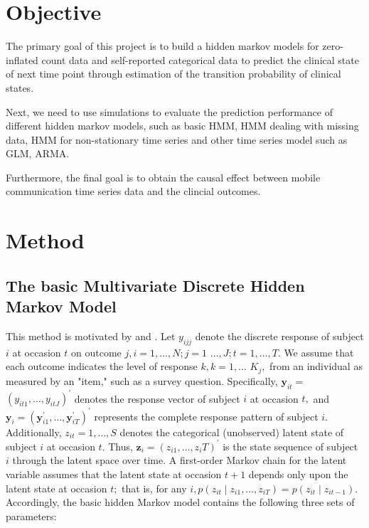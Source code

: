 \documentclass[12pt]{article}
\numberwithin{equation}{section}
\begin{document}
\section{Objective}

The primary goal of this project is to build a hidden markov models for zero-inflated count data and self-reported categorical data to predict the clinical state of next time point through estimation of the transition probability of clinical states.

Next, we need to use simulations to evaluate the prediction performance of different hidden markov models, such as basic HMM, HMM dealing with missing data, HMM for non-stationary time series and other time series model such as GLM, ARMA.

Furthermore, the final goal is to obtain the causal effect between mobile communication time series data and the clincial outcomes.

\section{Method}
\subsection{The basic Multivariate Discrete Hidden Markov Model}

This method is motivated by \citet{zhang2010multivariate} and \citet{ip2013partially}. Let $y_{i j j}$ denote the discrete response of subject $i$ at occasion $t$ on outcome $j, i=1, \ldots, N ; j=1$ $\ldots, J ; t=1, \ldots, T .$ We assume that each outcome indicates the level of response $k, k=1, \ldots$ $K_{j},$ from an individual as measured by an "item," such as a survey question. Specifically, $\mathbf{y}_{i t}=$ $\left(y_{i t 1}, \ldots, y_{i t J}\right)^{\prime}$ denotes the response vector of subject $i$ at occasion $t,$ and $\mathbf{y}_{i}=\left(\mathbf{y}_{i 1}^{\prime}, \ldots, \mathbf{y}_{i T}^{\prime}\right)^{\prime}$ represents the complete response pattern of subject $i$. Additionally, $z_{i t}=1, \ldots, S$ denotes the categorical (unobserved) latent state of subject $i$ at occasion $t .$ Thus, $\mathbf{z}_{i}=\left(z_{i 1}, \ldots, z_{i} T\right)^{\prime}$ is the state sequence of subject $i$ through the latent space over time. A first-order Markov chain for the latent variable assumes that the latent state at occasion $t+1$ depends only upon the latent state at occasion $t ;$ that is, for any $i, p\left(z_{i t} \mid z_{i 1}, \ldots, z_{i T}\right)=p\left(z_{i t} \mid z_{i t-1}\right) .$ Accordingly, the basic hidden Markov model contains the following three sets of parameters:
\end{document}
